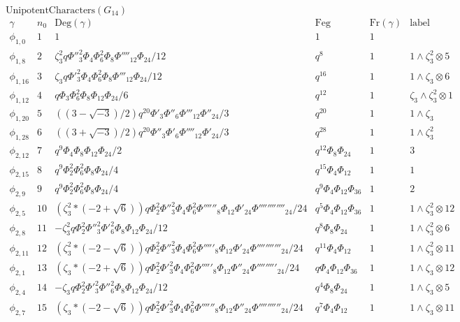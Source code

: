 \documentclass{article}
\begin{document}
$\mbox{UnipotentCharacters}(G_{14})$
$$
\begin{array}{c|ccccc}
\gamma&n_0&\mbox{Deg}(\gamma)&\mbox{Feg}&\mbox{Fr}(\gamma)&\mbox{label}\\
\hline
\phi_{1,0}&1&1&1&1&\\
\phi_{1,8}&2&\zeta_3^2q\Phi''_3^2\Phi_4\Phi_6^2\Phi_8\Phi''''_{12}\Phi_{24}/12&q^8&1&1\!\wedge\!\zeta_3^2\otimes5\\
\phi_{1,16}&3&\zeta_3q\Phi'_3^2\Phi_4\Phi_6^2\Phi_8\Phi'''_{12}\Phi_{24}/12&q^{16}&1&1\!\wedge\!\zeta_3\otimes6\\
\phi_{1,12}&4&q\Phi_3\Phi_6^2\Phi_8\Phi_{12}\Phi_{24}/6&q^{12}&1&\zeta_3\!\wedge\!\zeta_3^2\otimes1\\
\phi_{1,20}&5&((3-\sqrt{-3})/2)q^{20}\Phi'_3\Phi''_6\Phi'''_{12}\Phi''_{24}/3&q^{20}&1&1\!\wedge\!\zeta_3\\
\phi_{1,28}&6&((3+\sqrt{-3})/2)q^{20}\Phi''_3\Phi'_6\Phi''''_{12}\Phi'_{24}/3&q^{28}&1&1\!\wedge\!\zeta_3^2\\
\phi_{2,12}&7&q^9\Phi_4\Phi_8\Phi_{12}\Phi_{24}/2&q^{12}\Phi_8\Phi_{24}&1&3\\
\phi_{2,15}&8&q^9\Phi_2^2\Phi_6^2\Phi_8\Phi_{24}/4&q^{15}\Phi_4\Phi_{12}&1&1\\
\phi_{2,9}&9&q^9\Phi_2^2\Phi_6^2\Phi_8\Phi_{24}/4&q^9\Phi_4\Phi_{12}\Phi_{36}&1&2\\
\phi_{2,5}&10&(\zeta_3^2*(-2+\sqrt{6}))q\Phi_2^2\Phi''_3^2\Phi_4\Phi_6^2\Phi''''''_8\Phi_{12}\Phi'_{24}\Phi''''''''''''_{24}/24&q^5\Phi_4\Phi_{12}\Phi_{36}&1&1\!\wedge\!\zeta_3^2\otimes12\\
\phi_{2,8}&11&-\zeta_3^2q\Phi_2^2\Phi''_3^2\Phi'_6^2\Phi_8\Phi_{12}\Phi_{24}/12&q^8\Phi_8\Phi_{24}&1&1\!\wedge\!\zeta_3^2\otimes6\\
\phi_{2,11}&12&(\zeta_3^2*(-2-\sqrt{6}))q\Phi_2^2\Phi''_3^2\Phi_4\Phi_6^2\Phi'''''_8\Phi_{12}\Phi'_{24}\Phi'''''''''''_{24}/24&q^{11}\Phi_4\Phi_{12}&1&1\!\wedge\!\zeta_3^2\otimes11\\
\phi_{2,1}&13&(\zeta_3*(-2+\sqrt{6}))q\Phi_2^2\Phi'_3^2\Phi_4\Phi_6^2\Phi'''''_8\Phi_{12}\Phi''_{24}\Phi'''''''''_{24}/24&q\Phi_4\Phi_{12}\Phi_{36}&1&1\!\wedge\!\zeta_3\otimes12\\
\phi_{2,4}&14&-\zeta_3q\Phi_2^2\Phi'_3^2\Phi''_6^2\Phi_8\Phi_{12}\Phi_{24}/12&q^4\Phi_8\Phi_{24}&1&1\!\wedge\!\zeta_3\otimes5\\
\phi_{2,7}&15&(\zeta_3*(-2-\sqrt{6}))q\Phi_2^2\Phi'_3^2\Phi_4\Phi_6^2\Phi''''''_8\Phi_{12}\Phi''_{24}\Phi''''''''''_{24}/24&q^7\Phi_4\Phi_{12}&1&1\!\wedge\!\zeta_3\otimes11\\

\end{array}$$
\end{document}
